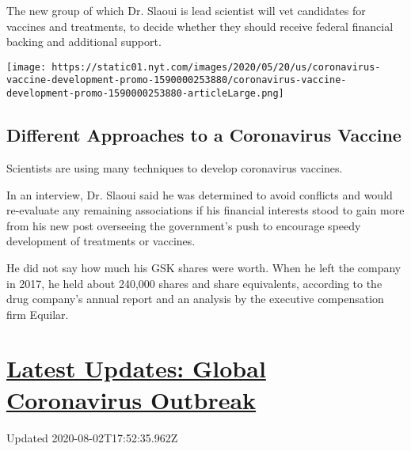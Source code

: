 The new group of which Dr. Slaoui is lead scientist will vet candidates
for vaccines and treatments, to decide whether they should receive
federal financial backing and additional support.

\href{https://www.nytimes.com/interactive/2020/05/20/science/coronavirus-vaccine-development.html}{}

\texttt{[image: https://static01.nyt.com/images/2020/05/20/us/coronavirus-vaccine-development-promo-1590000253880/coronavirus-vaccine-development-promo-1590000253880-articleLarge.png]}

\hypertarget{different-approaches-to-a-coronavirus-vaccine}{%
\subsection{Different Approaches to a Coronavirus
Vaccine}\label{different-approaches-to-a-coronavirus-vaccine}}

Scientists are using many techniques to develop coronavirus vaccines.

In an interview, Dr. Slaoui said he was determined to avoid conflicts
and would re-evaluate any remaining associations if his financial
interests stood to gain more from his new post overseeing the
government's push to encourage speedy development of treatments or
vaccines.

He did not say how much his GSK shares were worth. When he left the
company in 2017, he held about 240,000 shares and share equivalents,
according to the drug company's annual report and an analysis by the
executive compensation firm Equilar.

\hypertarget{latest-updates-global-coronavirus-outbreak}{%
\section{\texorpdfstring{\href{https://www.nytimes.com/2020/08/01/world/coronavirus-covid-19.html?action=click\&pgtype=Article\&state=default\&region=MAIN_CONTENT_1\&context=storylines_live_updates}{Latest
Updates: Global Coronavirus
Outbreak}}{Latest Updates: Global Coronavirus Outbreak}}\label{latest-updates-global-coronavirus-outbreak}}

Updated 2020-08-02T17:52:35.962Z

